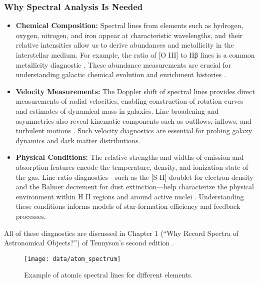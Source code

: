 \documentclass[english,bachelor,oneside]{ctufit-thesis}
\begin{document}
\subsubsection{Why Spectral Analysis Is Needed}
\begin{itemize}
    \item \textbf{Chemical Composition:} Spectral lines from elements such as hydrogen, oxygen, nitrogen, and iron appear at characteristic wavelengths, and their relative intensities allow us to derive abundances and metallicity in the interstellar medium. For example, the ratio of [O III] to Hβ lines is a common metallicity diagnostic \cite{Osterbrock2006}. These abundance measurements are crucial for understanding galactic chemical evolution and enrichment histories \cite{tennyson2019astronomical}.
    \item \textbf{Velocity Measurements:} The Doppler shift of spectral lines provides direct measurements of radial velocities, enabling construction of rotation curves and estimates of dynamical mass in galaxies. Line broadening and asymmetries also reveal kinematic components such as outflows, inflows, and turbulent motions \cite{Osterbrock2006}. Such velocity diagnostics are essential for probing galaxy dynamics and dark matter distributions.
    \item \textbf{Physical Conditions:} The relative strengths and widths of emission and absorption features encode the temperature, density, and ionization state of the gas. Line ratio diagnostics—such as the [S II] doublet for electron density and the Balmer decrement for dust extinction—help characterize the physical environment within H II regions and around active nuclei \cite{tennyson2019astronomical}. Understanding these conditions informs models of star-formation efficiency and feedback processes.
\end{itemize}
All of these diagnostics are discussed in Chapter 1 (“Why Record Spectra of Astronomical Objects?”) of Tennyson’s second edition \cite[p.~1–6]{tennyson2019astronomical}.


\begin{figure}[H]
    \centering
    \texttt{[image: data/atom\_spectrum]}
    \caption{Example of atomic spectral lines for different elements.\cite{Spectros98:online}}
    \label{fig:atom_spectrum}
\end{figure}
\end{document}
